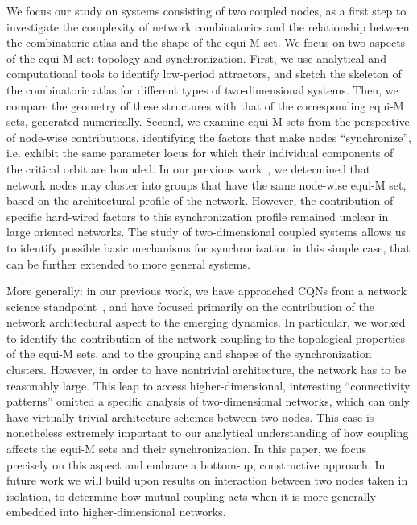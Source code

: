\documentclass[10pt]{article}
\begin{document}
We focus our study on systems consisting of two coupled nodes, as a first step to investigate the complexity of network combinatorics and the relationship between the combinatoric atlas and the shape of the equi-M set. We focus on two aspects of the equi-M set: topology and synchronization. First, we use analytical and computational tools to identify low-period attractors, and sketch the skeleton of the combinatoric atlas for different types of two-dimensional systems. Then, we compare the geometry of these structures with that of the corresponding equi-M sets, generated numerically. Second, we examine equi-M sets from the perspective of node-wise contributions, identifying the factors that make nodes ``synchronize'', i.e. exhibit the same parameter locus for which their individual components of the critical orbit are bounded. In our previous work~\cite{Simone,AC2}, we determined that network nodes may cluster into groups that have the same node-wise equi-M set, based on the architectural profile of the network. However, the contribution of specific hard-wired factors to this synchronization profile remained unclear in large oriented networks. The study of two-dimensional coupled systems allows us to identify possible basic mechanisms for synchronization in this simple case, that can be further extended to more general systems.

More generally: in our previous work, we have approached CQNs from a network science standpoint~\cite{AC2,gender}, and have focused primarily on the contribution of the network architectural aspect to the emerging dynamics. In particular, we worked to identify the contribution of the network coupling to the topological properties of the equi-M sets, and to the grouping and shapes of the synchronization clusters. However, in order to have nontrivial architecture, the network has to be reasonably large. This leap to access higher-dimensional, interesting ``connectivity patterns'' omitted a specific analysis of two-dimensional networks, which can only have virtually trivial architecture schemes between two nodes. This case is nonetheless extremely important to our analytical understanding of how coupling affects the equi-M sets and their synchronization. In this paper, we focus precisely on this aspect and embrace a bottom-up, constructive approach. In future work we will build upon results on interaction between two nodes taken in isolation, to determine how mutual coupling acts when it is more generally embedded into higher-dimensional networks.
\end{document}
